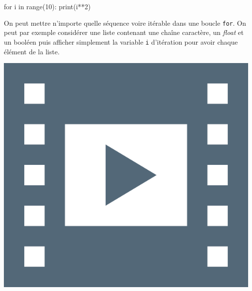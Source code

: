 \begin{idleconsole}
\begin{pyconsole}
for i in range(10):
    print(i**2)

\end{pyconsole}
\end{idleconsole}

On peut mettre n'importe quelle séquence voire itérable dans une boucle \texttt{for}. On peut par exemple considérer une liste contenant une chaîne caractère, un \textit{float} et un booléen puis afficher simplement la variable \texttt{i} d'itération pour avoir chaque élément de la liste.

\begin{marginvideo}
	[\label{vid:XI.7}Boucle \texttt{for}.]%
	\href{https://www.youtube.com/watch?v=Y-Ri2gdiOTA&list=PL2CXLryTKuwwlCGfgpApOTmMn7_dbtwWa&index=8}%
	  {\includegraphics[width=\marginparwidth]{./Images/Pictograms/film-strip-dark-electric-blue.png}}%
\end{marginvideo}

